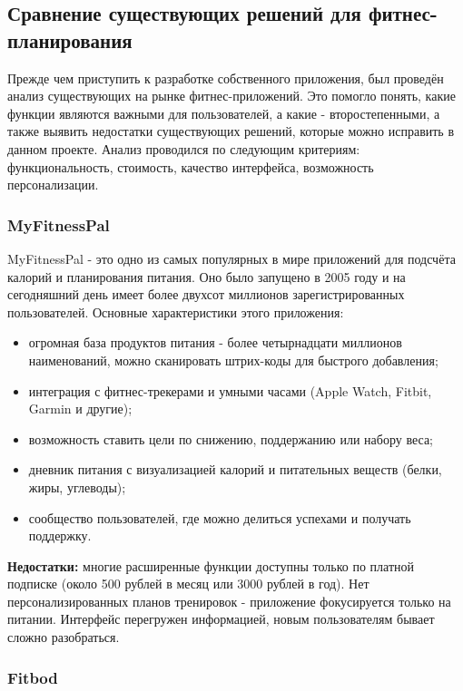 \documentclass[14pt, a4paper]{extarticle}
\begin{document}
\begin{enumerate}
\subsection{Сравнение существующих решений для фитнес-планирования}

\noindent Прежде чем приступить к разработке собственного приложения, был проведён анализ существующих на рынке фитнес-приложений. Это помогло понять, какие функции являются важными для пользователей, а какие - второстепенными, а также выявить недостатки существующих решений, которые можно исправить в данном проекте. Анализ проводился по следующим критериям: функциональность, стоимость, качество интерфейса, возможность персонализации.

\subsubsection{MyFitnessPal}

\noindent MyFitnessPal - это одно из самых популярных в мире приложений для подсчёта калорий и планирования питания. Оно было запущено в 2005 году и на сегодняшний день имеет более двухсот миллионов зарегистрированных пользователей. Основные характеристики этого приложения:

\begin{itemize}
\item огромная база продуктов питания - более четырнадцати миллионов наименований, можно сканировать штрих-коды для быстрого добавления;
\item интеграция с фитнес-трекерами и умными часами (Apple Watch, Fitbit, Garmin и другие);
\item возможность ставить цели по снижению, поддержанию или набору веса;
\item дневник питания с визуализацией калорий и питательных веществ (белки, жиры, углеводы);
\item сообщество пользователей, где можно делиться успехами и получать поддержку.
\end{itemize}

\noindent \textbf{Недостатки:} многие расширенные функции доступны только по платной подписке (около 500 рублей в месяц или 3000 рублей в год). Нет персонализированных планов тренировок - приложение фокусируется только на питании. Интерфейс перегружен информацией, новым пользователям бывает сложно разобраться.

\subsubsection{Fitbod}


\end{enumerate}
\end{document}
